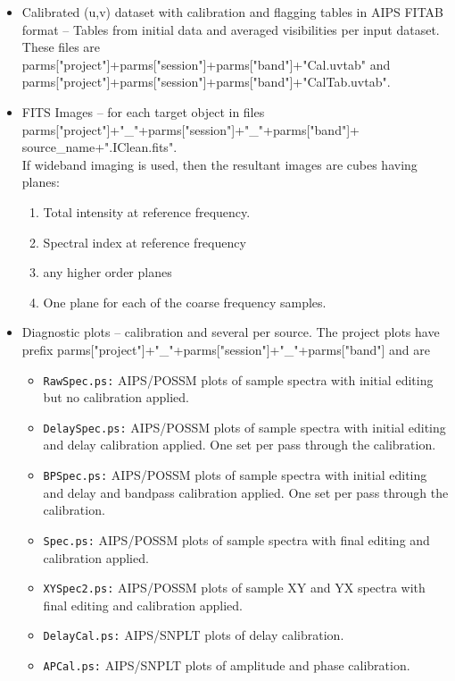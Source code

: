 \documentclass[11pt]{article}
\begin{document}
\begin{itemize}
\item Calibrated (u,v) dataset with calibration and flagging tables in
AIPS FITAB format -- Tables from initial data and averaged
visibilities per input dataset. 
These files are\\
parms["project"]+parms["session"]+parms["band"]+"Cal.uvtab"
and parms["project"]+parms["session"]+parms["band"]+"CalTab.uvtab".
\item FITS Images -- for each target object in files\\
parms["project"]+"\_"+parms["session"]+"\_"+parms["band"]+\\
source\_name+".IClean.fits".\\
If wideband imaging is used, then the resultant images are cubes
having planes:
\begin{enumerate}
\item Total intensity at reference frequency.
\item Spectral index at reference frequency
\item any higher order planes
\item One plane for each of the coarse frequency samples.
\end{enumerate}
\item Diagnostic plots -- calibration and several per source.
The project plots have prefix
parms["project"]+"\_"+parms["session"]+"\_"+parms["band"] and are
\begin{itemize}
\item{\tt RawSpec.ps:} AIPS/POSSM plots of sample spectra with initial
editing but no calibration applied.
\item{\tt DelaySpec.ps:} AIPS/POSSM plots of sample spectra with initial
editing and delay calibration applied.
One set per pass through the calibration.
\item{\tt BPSpec.ps:} AIPS/POSSM plots of sample spectra with initial
editing and delay and bandpass calibration applied.
One set per pass through the calibration.
\item{\tt Spec.ps:} AIPS/POSSM plots of sample spectra with final
editing and calibration applied.
\item{\tt XYSpec2.ps:} AIPS/POSSM plots of sample XY and YX spectra
with final editing and calibration applied.
\item{\tt DelayCal.ps:} AIPS/SNPLT plots of delay calibration.
\item{\tt APCal.ps:} AIPS/SNPLT plots of amplitude and phase calibration.
\end{itemize}

\end{itemize}
\end{document}
